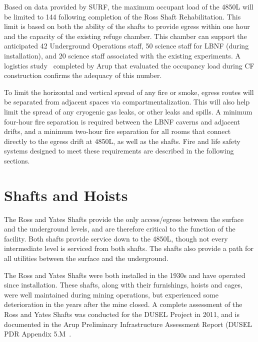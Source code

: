 Based on data provided by SURF, the maximum occupant load of the 4850L will be limited to %
144 following completion of the Ross Shaft Rehabilitation. This limit is based on both the ability of the shafts to provide egress within one hour and the capacity of the existing refuge chamber.  This chamber can support the anticipated 42 Underground Operations staff, 50 science staff for LBNF (during installation), and 20 science staff associated with the existing experiments. A logistics study~\cite{lbnf-logistics} completed by Arup that evaluated the occupancy load during CF construction %
confirms the adequacy of this number.

To limit the horizontal and vertical spread of any fire or smoke, egress routes will be separated from adjacent spaces via  compartmentalization. This will also help limit the spread of %
any cryogenic gas leaks, or other leaks and spills. %
A minimum four-hour fire separation is required between the LBNF caverns and adjacent drifts, and a minimum two-hour fire separation for all rooms that connect directly to the egress drift at 4850L, as well as the shafts. %
Fire and life safety systems designed to meet these requirements %
are described in the following sections.


\section{Shafts and Hoists}
\label{sec:fscf-und-shafts}

The Ross and Yates Shafts provide the only access/egress between the surface and the underground levels, and are therefore critical to the function of the facility. Both shafts provide service down to the 4850L, though not every intermediate level is serviced from both shafts. The shafts also provide a path for all utilities between the surface and the underground. 

The Ross and Yates Shafts were both installed in the 1930s and have operated since installation. These shafts, along with their furnishings, hoists and cages, were well maintained during mining operations, but experienced some deterioration in the years after the mine closed. %
A complete assessment of the Ross and Yates Shafts was conducted for the DUSEL Project in 2011, and is documented in the Arup Preliminary Infrastructure Assessment Report (DUSEL PDR Appendix 5.M~\cite{dusel-pdr}.



